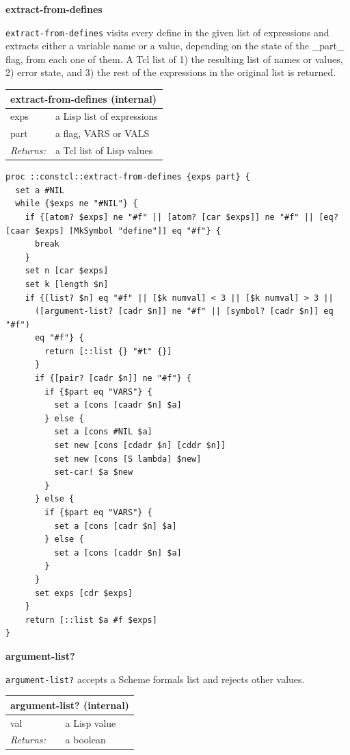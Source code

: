 \documentclass[twoside,9pt]{report}
\begin{document}
\textbf{extract-from-defines}


\texttt{extract-from-defines} visits every define in the given list of expressions and extracts either a variable name or a value, depending on the state of the \_part\_ flag, from each one of them. A Tcl list of 1) the resulting list of names or values, 2) error state, and 3) the rest of the expressions in the original list is returned.

\begin{tabular}{ |l l| }
\hline
\multicolumn{2}{|l|}{extract-from-defines (internal)} \\
\hline
exps & a Lisp list of expressions \\
part & a flag, VARS or VALS \\
\textit{Returns:} & a Tcl list of Lisp values \\
\hline
\end{tabular}

\noindent\makebox[\linewidth]{\rule{\linewidth}{0.4pt}}
\begin{lstlisting}
proc ::constcl::extract-from-defines {exps part} {
  set a #NIL
  while {$exps ne "#NIL"} {
    if {[atom? $exps] ne "#f" || [atom? [car $exps]] ne "#f" || [eq? [caar $exps] [MkSymbol "define"]] eq "#f"} {
      break
    }
    set n [car $exps]
    set k [length $n]
    if {[list? $n] eq "#f" || [$k numval] < 3 || [$k numval] > 3 ||
      ([argument-list? [cadr $n]] ne "#f" || [symbol? [cadr $n]] eq "#f")
      eq "#f"} {
        return [::list {} "#t" {}]
      }
      if {[pair? [cadr $n]] ne "#f"} {
        if {$part eq "VARS"} {
          set a [cons [caadr $n] $a]
        } else {
          set a [cons #NIL $a]
          set new [cons [cdadr $n] [cddr $n]]
          set new [cons [S lambda] $new]
          set-car! $a $new
        }
      } else {
        if {$part eq "VARS"} {
          set a [cons [cadr $n] $a]
        } else {
          set a [cons [caddr $n] $a]
        }
      }
      set exps [cdr $exps]
    }
    return [::list $a #f $exps]
}
\end{lstlisting}
\noindent\makebox[\linewidth]{\rule{\linewidth}{0.4pt}}

\textbf{argument-list?}


\texttt{argument-list?} accepts a Scheme formals list and rejects other values.

\begin{tabular}{ |l l| }
\hline
\multicolumn{2}{|l|}{argument-list? (internal)} \\
\hline
val & a Lisp value \\
\textit{Returns:} & a boolean \\
\hline
\end{tabular}
\end{document}
